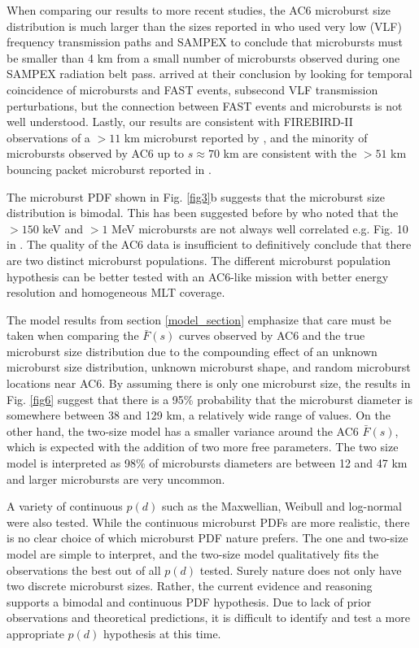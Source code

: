 When comparing our results to more recent studies, the AC6 microburst size distribution is much larger than the sizes reported in \citet{Dietrich2010} who used very low (VLF) frequency transmission paths and SAMPEX to conclude that microbursts must be smaller than 4 km from a small number of microbursts observed during one SAMPEX radiation belt pass. \citet{Dietrich2010} arrived at their conclusion by looking for temporal coincidence of microbursts and FAST events, subsecond VLF transmission perturbations, but the connection between FAST events and microbursts is not well understood. Lastly, our results are consistent with FIREBIRD-II observations of a $> 11$ km microburst reported by \citet{Crew2016}, and the minority of microbursts observed by AC6 up to $s \approx 70$ km are consistent with the $> 51$ km bouncing packet microburst reported in \citet{Shumko2018a}.

The microburst PDF shown in Fig. \ref{fig3}b suggests that the microburst size distribution is bimodal. This has been suggested before by \citet{Blake1996} who noted that the $> 150$ keV and $> 1$ MeV microbursts are not always well correlated e.g. Fig. 10 in \citet{Blake1996}. The quality of the AC6 data is insufficient to definitively conclude that there are two distinct microburst populations. The different microburst population hypothesis can be better tested with an AC6-like mission with better energy resolution and homogeneous MLT coverage.

The model results from section \ref{model_section} emphasize that care must be taken when comparing the $\bar{F}(s)$ curves observed by AC6 and the true microburst size distribution due to the compounding effect of an unknown microburst size distribution, unknown microburst shape, and random microburst locations near AC6. By assuming there is only one microburst size, the results in Fig. \ref{fig6} suggest that there is a 95\% probability that the microburst diameter is somewhere between 38 and 129 km, a relatively wide range of values. On the other hand, the two-size model has a smaller variance around the AC6 $\bar{F}(s)$, which is expected with the addition of two more free parameters. The two size model is interpreted as 98\% of microbursts diameters are between 12 and 47 km and larger microbursts are very uncommon. 

A variety of continuous $p(d)$ such as the Maxwellian, Weibull and log-normal were also tested. While the continuous microburst PDFs are more realistic, there is no clear choice of which microburst PDF nature prefers. The one and two-size model are simple to interpret, and the two-size model qualitatively fits the observations the best out of all $p(d)$ tested. Surely nature does not only have two discrete microburst sizes. Rather, the current evidence and reasoning supports a bimodal and continuous PDF hypothesis. Due to lack of prior observations and theoretical predictions, it is difficult to identify and test a more appropriate $p(d)$ hypothesis at this time.

